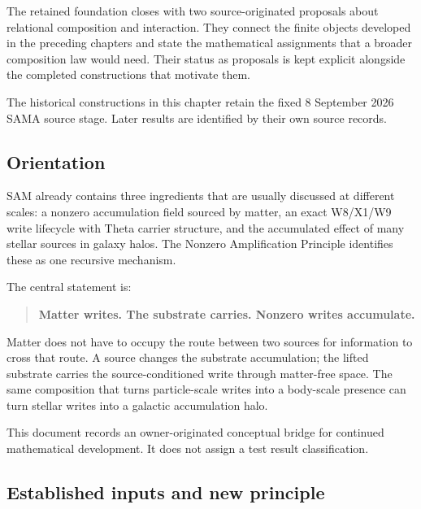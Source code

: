\label{viii-ch12-relational-composition-and-the-boundary-of-the-volume}

The retained foundation closes with two source-originated proposals about relational composition and interaction. They connect the finite objects developed in the preceding chapters and state the mathematical assignments that a broader composition law would need. Their status as proposals is kept explicit alongside the completed constructions that motivate them.

The historical constructions in this chapter retain the fixed 8 September 2026 SAMA source stage. Later results are identified by their own source records.

\subsection{Orientation}\label{viii-ch12-orientation}

SAM already contains three ingredients that are usually discussed at
different scales: a nonzero accumulation field sourced by matter, an
exact W8/X1/W9 write lifecycle with Theta carrier structure, and the
accumulated effect of many stellar sources in galaxy halos. The Nonzero
Amplification Principle identifies these as one recursive mechanism.

The central statement is:

\begin{quote}
\textbf{Matter writes. The substrate carries. Nonzero writes
accumulate.}
\end{quote}

Matter does not have to occupy the route between two sources for
information to cross that route. A source changes the substrate
accumulation; the lifted substrate carries the source-conditioned write
through matter-free space. The same composition that turns
particle-scale writes into a body-scale presence can turn stellar writes
into a galactic accumulation halo.

This document records an owner-originated conceptual bridge for
continued mathematical development. It does not assign a test result
classification.

\subsection{Established inputs and new
principle}\label{viii-ch12-established-inputs-and-new-principle}

